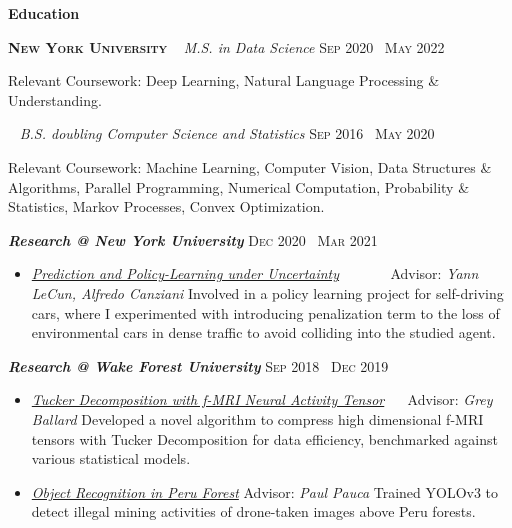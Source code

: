 \documentclass{resume} %
\begin{document}
\begin{rSection}{\Large \textbf{Education}}

{\bf \large{\textsc{New York University}}} \,\,\, \textsl{M.S. in Data Science} \hfill  \textsc{Sep 2020  \textendash\  May 2022}
\vspace{-5px}

Relevant Coursework: Deep Learning, Natural Language Processing \& Understanding.

 \,\,\, \textsl{B.S. doubling Computer Science and Statistics}       \hfill  \textsc{Sep 2016  \textendash\  May 2020}
\vspace{-5px}

Relevant Coursework: Machine Learning, Computer Vision, Data Structures \& Algorithms, Parallel Programming, Numerical Computation, Probability \& Statistics, Markov Processes, Convex Optimization.


{\bf \textsl{Research @ New York University}}      \textsc{\hfill Dec 2020  \textendash\  Mar 2021}
\vspace{-1mm}
{\begin{itemize} [topsep=-2px,partopsep= 0px, itemsep=-2px]
\item  \emph{\underline {Prediction and Policy-Learning under Uncertainty}} \ \ 
{{\href{https://github.com/Atcold/pytorch-PPUU}{\faGithub}}} \ \ \ \  
\hfill Advisor: \emph{Yann LeCun, Alfredo Canziani} 
\vspace{0.5mm}
\newline Involved in a policy learning project for self-driving cars, where I experimented with introducing penalization term to the loss of environmental cars in dense traffic to avoid colliding into the studied agent.

\end{itemize}}
\vspace{0.5mm}
{\bf \textsl{Research @ Wake Forest University}}     \textsc{\hfill Sep 2018  \textendash\  Dec 2019}
\vspace{-1mm}
{\begin{itemize} [topsep=-2px,partopsep= 0px, itemsep=-2px]
\item \emph{\underline{Tucker Decomposition with f-MRI Neural Activity Tensor}} \ \  {{\href{https://github.com/billxbf/TuckerLCBN/tree/master}{\faGithub}}} 
\hfill Advisor: \emph{Grey Ballard}
\vspace{0.5mm}
\newline Developed a novel algorithm to compress high dimensional f-MRI tensors with Tucker Decomposition for data efficiency, benchmarked against various statistical models.
\item \emph{\underline{Object Recognition in Peru Forest}} \hfill Advisor: \emph{Paul Pauca}
\vspace{0.5mm}
\newline Trained YOLOv3 to detect illegal mining activities of drone-taken images above Peru forests.
\end{itemize}}

\end{rSection}
\end{document}
